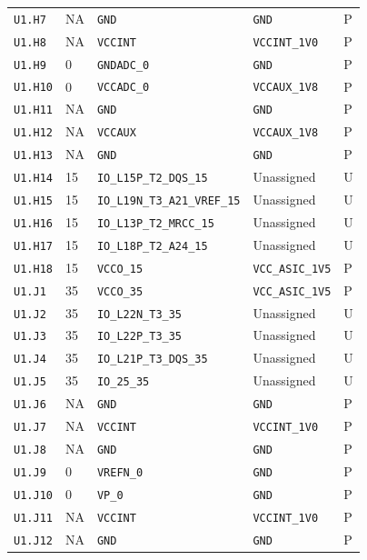 \documentclass[11pt,a4paper]{article}
\begin{document}
\begin{longtable}{@{}P{20mm}P{10mm}P{75mm}P{49mm}P{7mm}@{}}
\nolinkurl{U1.H7} & NA & \nolinkurl{GND} & \nolinkurl{GND} & P \\
\nolinkurl{U1.H8} & NA & \nolinkurl{VCCINT} & \nolinkurl{VCCINT_1V0} & P \\
\nolinkurl{U1.H9} & 0 & \nolinkurl{GNDADC_0} & \nolinkurl{GND} & P \\
\nolinkurl{U1.H10} & 0 & \nolinkurl{VCCADC_0} & \nolinkurl{VCCAUX_1V8} & P \\
\nolinkurl{U1.H11} & NA & \nolinkurl{GND} & \nolinkurl{GND} & P \\
\nolinkurl{U1.H12} & NA & \nolinkurl{VCCAUX} & \nolinkurl{VCCAUX_1V8} & P \\
\nolinkurl{U1.H13} & NA & \nolinkurl{GND} & \nolinkurl{GND} & P \\
\nolinkurl{U1.H14} & 15 & \nolinkurl{IO_L15P_T2_DQS_15} & Unassigned & U \\
\nolinkurl{U1.H15} & 15 & \nolinkurl{IO_L19N_T3_A21_VREF_15} & Unassigned & U \\
\nolinkurl{U1.H16} & 15 & \nolinkurl{IO_L13P_T2_MRCC_15} & Unassigned & U \\
\nolinkurl{U1.H17} & 15 & \nolinkurl{IO_L18P_T2_A24_15} & Unassigned & U \\
\nolinkurl{U1.H18} & 15 & \nolinkurl{VCCO_15} & \nolinkurl{VCC_ASIC_1V5} & P \\
\nolinkurl{U1.J1} & 35 & \nolinkurl{VCCO_35} & \nolinkurl{VCC_ASIC_1V5} & P \\
\nolinkurl{U1.J2} & 35 & \nolinkurl{IO_L22N_T3_35} & Unassigned & U \\
\nolinkurl{U1.J3} & 35 & \nolinkurl{IO_L22P_T3_35} & Unassigned & U \\
\nolinkurl{U1.J4} & 35 & \nolinkurl{IO_L21P_T3_DQS_35} & Unassigned & U \\
\nolinkurl{U1.J5} & 35 & \nolinkurl{IO_25_35} & Unassigned & U \\
\nolinkurl{U1.J6} & NA & \nolinkurl{GND} & \nolinkurl{GND} & P \\
\nolinkurl{U1.J7} & NA & \nolinkurl{VCCINT} & \nolinkurl{VCCINT_1V0} & P \\
\nolinkurl{U1.J8} & NA & \nolinkurl{GND} & \nolinkurl{GND} & P \\
\nolinkurl{U1.J9} & 0 & \nolinkurl{VREFN_0} & \nolinkurl{GND} & P \\
\nolinkurl{U1.J10} & 0 & \nolinkurl{VP_0} & \nolinkurl{GND} & P \\
\nolinkurl{U1.J11} & NA & \nolinkurl{VCCINT} & \nolinkurl{VCCINT_1V0} & P \\
\nolinkurl{U1.J12} & NA & \nolinkurl{GND} & \nolinkurl{GND} & P \\

\end{longtable}
\end{document}
